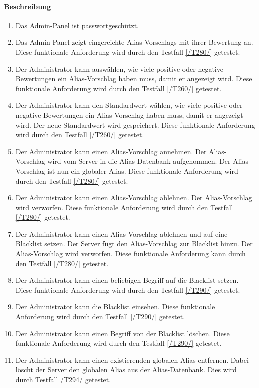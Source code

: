 \paragraph{Beschreibung}
\begin{enumerate}[start=101, label=\textbf{/FA\arabic*/}, align=left]
    \item Das \Gls{Admin-Panel} ist passwortgeschützt.
    \item \label{/FA102/} Das \Gls{Admin-Panel} zeigt eingereichte \Glspl{Alias-Vorschlag} mit ihrer Bewertung an. Diese funktionale Anforderung wird durch den Testfall \ref{/T280/} getestet.
    \item \label{/FA103/} Der \Gls{Administrator} kann auswählen, wie viele positive oder negative Bewertungen ein \Gls{Alias-Vorschlag} haben muss, damit er angezeigt wird. Diese funktionale Anforderung wird durch den Testfall \ref{/T260/} getestet.
    \item \label{/FA104/} Der \Gls{Administrator} kann den Standardwert wählen, wie viele positive oder negative Bewertungen ein \Gls{Alias-Vorschlag} haben muss, damit er angezeigt wird. Der neue Standardwert wird gespeichert. Diese funktionale Anforderung wird durch den Testfall \ref{/T260/} getestet.
    \item \label{/FA105/} Der \Gls{Administrator} kann einen \Gls{Alias-Vorschlag} annehmen. Der \Gls{Alias-Vorschlag} wird vom \Gls{Server} in die \Gls{Alias}-\Gls{Datenbank} aufgenommen. Der \Gls{Alias-Vorschlag} ist nun ein \gls{global}er \Gls{Alias}. Diese funktionale Anforderung wird durch den Testfall \ref{/T280/} getestet.
    \item \label{/FA106/} Der \Gls{Administrator} kann einen \Gls{Alias-Vorschlag} ablehnen. Der \Gls{Alias-Vorschlag} wird verworfen. Diese funktionale Anforderung wird durch den Testfall \ref{/T280/} getestet.
    \item \label{/FA107/} Der \Gls{Administrator} kann einen \Gls{Alias-Vorschlag} ablehnen und auf eine \Gls{Blacklist} setzen. Der \Gls{Server} fügt den {Alias-Vorschlag} zur \Gls{Blacklist} hinzu. Der \Gls{Alias-Vorschlag} wird verworfen. Diese funktionale Anforderung kann durch den Testfall \ref{/T280/} getestet.
    \item \label{/FA108/} Der \Gls{Administrator} kann einen beliebigen Begriff auf die \Gls{Blacklist} setzen. Diese funktionale Anforderung wird durch den Testfall \ref{/T290/} getestet.
    \item \label{/FA109/} Der \Gls{Administrator} kann die \Gls{Blacklist} einsehen. Diese funktionale Anforderung wird durch den Testfall \ref{/T290/} getestet.
    \item \label{/FA110/} Der \Gls{Administrator} kann einen Begriff von der \Gls{Blacklist} löschen. Diese funktionale Anforderung wird durch den Testfall \ref{/T290/} getestet.
    \item \label{/FA111/} Der \Gls{Administrator} kann einen existierenden \gls{global}en \Gls{Alias} entfernen. Dabei löscht der \Gls{Server} den \gls{global}en \Gls{Alias} aus der \Gls{Alias}-\Gls{Datenbank}. Dies wird durch Testfall \hyperref[/T294/]{/T294/} getestet.
\end{enumerate}